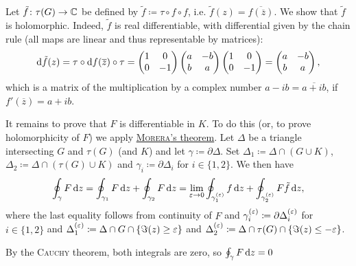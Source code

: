 \documentclass[a4paper,english]{article}
\begin{document}
\begin{pr}
    Let $\tilde{f} \colon \tau(G) \to \operatorname{\mathbb{C}}$ be defined by $\tilde{f} \coloneqq \tau \circ f \circ f$, i.e. $\tilde{f}(z) = \overline{f(\overline{z})}$.
    We show that $\tilde{f}$ is holomorphic.
    Indeed, $\tilde{f}$ is real differentiable, with differential given by the chain rule (all maps are linear and thus representable by matrices):
    \begin{equation*}
        \mathop{}\!\mathrm{d} \tilde{f}(z)
        = \tau \circ \mathop{}\!\mathrm{d} f(\overline{z}) \circ \tau
        = \begin{pmatrix} 1 & 0 \\ 0 & - 1 \end{pmatrix}
        \begin{pmatrix} a & -b \\ b & a \end{pmatrix}
        \begin{pmatrix} 1 & 0 \\ 0 & - 1 \end{pmatrix}
        = \begin{pmatrix} a & -b \\ b & a \end{pmatrix},
    \end{equation*}
    which is a matrix of the multiplication by a complex number $a - i b = \overline{a + i b}$, if $f'(\overline{z}) = a + i b$.
    
    It remains to prove that $F$ is differentiable in $K$.
    To do this (or, to prove holomorphicity of $F$) we apply \hyperref[th:morera]{\textsc{Morera}'s theorem}.
    Let $\Delta$ be a triangle intersecting $G$ and $\tau(G)$ (and $K$) and let $\gamma \coloneqq \partial \Delta$.
    Set $\Delta_1 \coloneqq \Delta \cap (G \cup K)$, $\Delta_2 \coloneqq \Delta \cap (\tau(G) \cup K)$ and $\gamma_i \coloneqq \partial \Delta_i$ for $i \in \{1, 2\}$.
    We then have
    \begin{equation*}
        \oint_{\gamma} F \mathop{}\!\mathrm{d}{z}
        = \oint_{\gamma_1} F \mathop{}\!\mathrm{d}{z} + \oint_{\gamma_2} F \mathop{}\!\mathrm{d}{z} 
        = \lim_{\varepsilon \to 0} \oint_{\gamma_1^{(\varepsilon)}} f \mathop{}\!\mathrm{d}{z} + \oint_{\gamma_2^{(\varepsilon)}} F
        \tilde{f}\mathop{}\!\mathrm{d}{z},
    \end{equation*}
    where the last equality follows from continuity of $F$ and $\gamma_i^{(\varepsilon)} \coloneqq \partial \Delta_i^{(\varepsilon)}$ for $i \in \{1, 2\}$ and $\Delta_1^{(\varepsilon)} \coloneqq \Delta \cap G \cap \{ \Im(z) \ge \varepsilon \}$ and $\Delta_2^{(\varepsilon)} \coloneqq \Delta \cap \tau(G) \cap \{ \Im(z) \le -\varepsilon \}$.
    
    By the \textsc{Cauchy} theorem, both integrals are zero, so $\oint_{\gamma} F \mathop{}\!\mathrm{d}{z} = 0$  
\end{pr}
\end{document}
